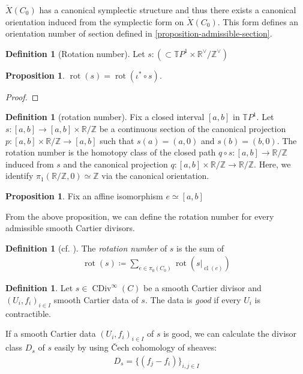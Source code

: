 \documentclass[a4paper,dvipdfmx,reqno,12pt]{amsart}
\theoremstyle{definition}
\newtheorem{definition}[theorem]{Definition}
\newtheorem{proposition}[theorem]{Proposition}
\newcommand{\deq}{\coloneqq}
\newcommand{\opn}[1]{\operatorname{#1}}
\numberwithin{equation}{section}
\begin{document}
$\check{X}(C_0)$ has a canonical symplectic structure
and thus there exists a canonical orientation induced
from the symplectic form on $\check{X}(C_0)$.
This form defines an orientation number of 
section defined in \cref{proposition-admissible-section}.

\begin{definition}[{Rotation number}]
Let $s\colon  (\subset \mathbb{T}P^{1}\times \mathbb{R}^{\vee}/\mathbb{Z}^{\vee})$
\end{definition}

\begin{proposition}
$\opn{rot}(s)=\opn{rot}(\iota^{*}\circ s)$.
\end{proposition}

\begin{proof}

\end{proof}

\begin{definition}[{rotation number}]
Fix a closed interval $[a,b]$ in $\mathbb{T}P^{1}$.
Let $s\colon [a,b]\to [a,b]\times \mathbb{R}/\mathbb{Z}$ be 
a continuous section of the canonical projection
$p\colon [a,b]\times \mathbb{R}/\mathbb{Z} \to [a,b]$
such that $s(a)=(a,0)$ and $s(b)=(b,0)$. 
The rotation number
is the homotopy class of the closed path
$q\circ s\colon [a,b]\to \mathbb{R}/\mathbb{Z}$
induced from $s$ and the canonical projection
$q\colon [a,b]\times \mathbb{R}/\mathbb{Z} 
\to \mathbb{R}/\mathbb{Z}$. Here, 
we identify $\pi_1(\mathbb{R}/\mathbb{Z},0)\simeq \mathbb{Z}$
via the canonical orientation.
\end{definition}

\begin{proposition}
Fix an affine isomorphism $e\simeq [a,b]$ 
\end{proposition}

From the above proposition, we can define the 
rotation number for every admissible smooth 
Cartier divisors.
\begin{definition}[{cf. \cite{auroux2022lagrangian}}]
The \emph{rotation number} of $s$ is the sum of
\begin{align}
\opn{rot}(s)\deq \sum_{e\in \pi_0(C_0)}
\opn{rot}(s|_{\opn{cl}(e)})
\end{align}

\end{definition}

\begin{definition}
Let $s\in \opn{CDiv}^{\infty}(C)$ be a smooth Cartier
divisor and $(U_i,f_i)_{i\in I}$ smooth Cartier data
of $s$. The data is \emph{good} if 
every $U_i$ is contractible.
\end{definition}
If a smooth Cartier data $(U_i,f_i)_{i\in I}$ of $s$ 
is good,
we can calculate the divisor class $D_s$ of $s$ easily
by using \v{C}ech cohomology of sheaves:
\begin{align}
D_s=\{(f_j-f_i)\}_{i,j\in I}
\end{align}
\end{document}
